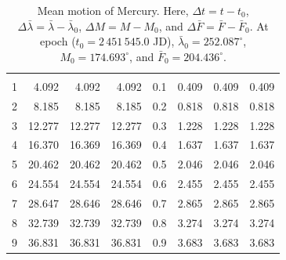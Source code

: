 \begin{table}[!h]
\begin{tabular}{rrrr|rrrr}
&&&&&&&\\
1 &   4.092 &   4.092 &   4.092 & 0.1 &   0.409 &   0.409 &   0.409\\
2 &   8.185 &   8.185 &   8.185 & 0.2 &   0.818 &   0.818 &   0.818\\
3 &  12.277 &  12.277 &  12.277 & 0.3 &   1.228 &   1.228 &   1.228\\
4 &  16.370 &  16.369 &  16.369 & 0.4 &   1.637 &   1.637 &   1.637\\
5 &  20.462 &  20.462 &  20.462 & 0.5 &   2.046 &   2.046 &   2.046\\
6 &  24.554 &  24.554 &  24.554 & 0.6 &   2.455 &   2.455 &   2.455\\
7 &  28.647 &  28.646 &  28.646 & 0.7 &   2.865 &   2.865 &   2.865\\
8 &  32.739 &  32.739 &  32.739 & 0.8 &   3.274 &   3.274 &   3.274\\
9 &  36.831 &  36.831 &  36.831 & 0.9 &   3.683 &   3.683 &   3.683\\
\end{tabular}
\caption{Mean motion of Mercury.  Here, $\Delta t = t-t_0$, $\Delta\bar{\lambda} = \bar{\lambda}-\bar{\lambda}_0$, $\Delta M = M - M_0$, and $\Delta \bar{F} = \bar{F} - \bar{F}_0$. At epoch  ($t_0 = 2\,451\,545.0$ JD), $\bar{\lambda}_0 = 252.087^\circ$,  $M_0 = 174.693^\circ$,
and $\bar{F}_0 = 204.436^\circ$. }\label{vt20}
\end{table}

